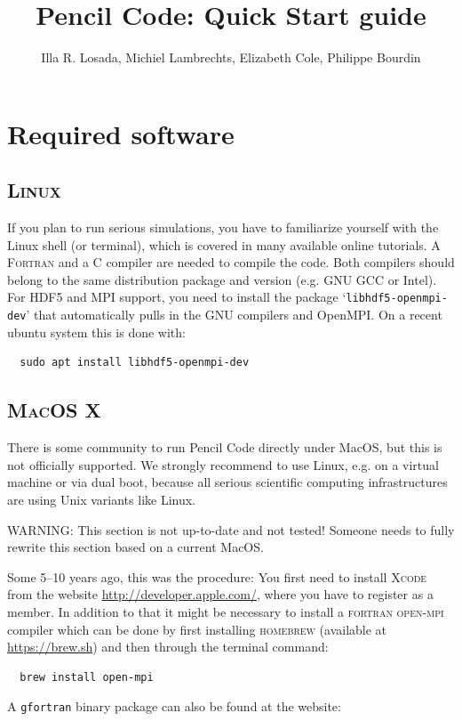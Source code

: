 \documentclass[a4paper,12pt]{article}
\title{Pencil Code: Quick Start guide}
\author{Illa R. Losada, Michiel Lambrechts, Elizabeth Cole, Philippe Bourdin}
\newcommand{\command}[1]{\texttt{#1}}
\newcommand{\directory}[1]{`\texttt{#1}'}
\newcommand{\name}[1]{\textsc{#1}}
\begin{document}
\maketitle

\tableofcontents

\newpage

\section{Required software}

\subsection{\name{Linux}}
If you plan to run serious simulations, you have to familiarize yourself with the Linux shell (or terminal), which is covered in many available online tutorials.
A \name{Fortran} and a \name{C} compiler are needed to compile the code.
Both compilers should belong to the same distribution package and version (e.g. GNU GCC or Intel).
For HDF5 and MPI support, you need to install the package \directory{libhdf5-openmpi-dev} that automatically pulls in the GNU compilers and OpenMPI. On a recent ubuntu system this is done with:
\begin{verbatim}
  sudo apt install libhdf5-openmpi-dev
\end{verbatim}

\subsection{\name{MacOS X}}
There is some community to run Pencil Code directly under MacOS, but this is not officially supported. We strongly recommend to use Linux, e.g. on a virtual machine or via dual boot, because all serious scientific computing infrastructures are using Unix variants like Linux.

WARNING: This section is not up-to-date and not tested! Someone needs to fully rewrite this section based on a current MacOS.

Some 5--10 years ago, this was the procedure:
You first need to install \name{Xcode} from the
website \url{http://developer.apple.com/}, where you have to register as a member.
In addition to that it might be necessary to install a \name{fortran} \name{open-mpi} compiler which can be done by first installing \name{homebrew} (available at \url{https://brew.sh}) and then through the terminal command:
\begin{verbatim}
  brew install open-mpi
\end{verbatim}
A \command{gfortran} binary package can also be found at the website:
\end{document}

